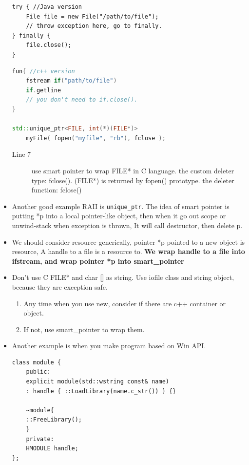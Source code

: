 \documentclass[a4paper,11pt,twoside]{book}
\begin{document}
\begin{itemize}
\begin{lstlisting}[numbers = none]
try { //Java version
	File file = new File("/path/to/file");
	// throw exception here, go to finally.
} finally {
	file.close();
}
\end{lstlisting}
	
\begin{lstlisting}[frame=single, language=c++]
fun{ //c++ version
	fstream if("path/to/file")
	if.getline
	// you don't need to if.close().
}
	
std::unique_ptr<FILE, int(*)(FILE*)> 
	myFile( fopen("myfile", "rb"), fclose );              
\end{lstlisting}
\begin{description}
	\item[Line 7] use smart pointer to wrap FILE* in C language. the custom deleter type: fclose(). (FILE*) is returned by fopen() prototype. the deleter function: fclose() 
\end{description}
	
	\item Another good example RAII is \texttt{unique\_ptr}. The idea of smart pointer is putting *p into a local pointer-like object, then when it go out scope or unwind-stack when exception is thrown, It will call destructor, then delete p.
	
	\item We should consider resource generically, pointer *p pointed to a new object is resource, A handle to a file is a resource to. \textbf{We wrap handle to a file into ifstream, and wrap pointer *p into smart\_pointer}
	

	\item Don't use C FILE* and char [] as string. Use iofile class and string object, because they are exception safe.
	\begin{enumerate}
		\item Any time when you use new, consider if there are c++ container or object.
		\item If not, use smart\_pointer to wrap them.
	\end{enumerate}
	
\item Another example is when you make program based on Win API.
\begin{lstlisting}[numbers=none]
class module {
	public:
	explicit module(std::wstring const& name)
	: handle { ::LoadLibrary(name.c_str()) } {}
	
	~module{
	::FreeLibrary();
	}
	private:
	HMODULE handle;
};
	\end{lstlisting}
\end{itemize}
\end{document}
